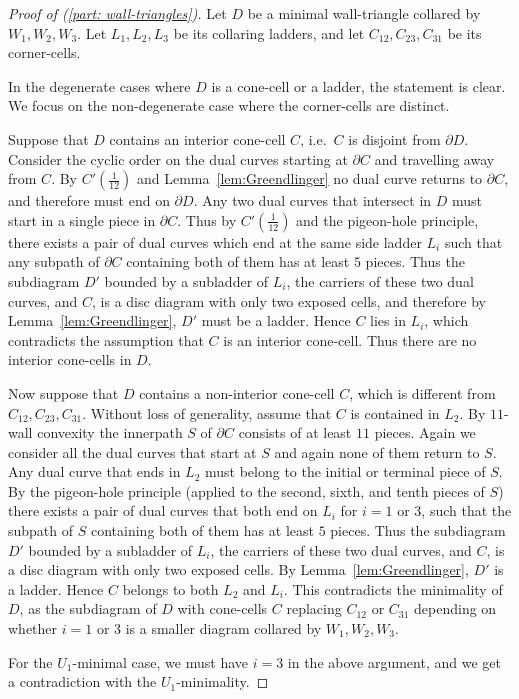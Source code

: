 \documentclass[12pt,oneside]{amsart}
\theoremstyle{definition}
\theoremstyle{definition}
\theoremstyle{remark}
\begin{document}
\begin{proof}[Proof of (\ref{part: wall-triangles})]
Let $D$ be a minimal wall-triangle collared by $W_1,W_2, W_3$. Let $L_1, L_2, L_3$ be its collaring ladders, and let $C_{12}, C_{23}, C_{31}$ be its corner-cells.  

In the  degenerate cases where $ D$ is a cone-cell or a ladder, the statement is clear.  
We focus on the non-degenerate case where the corner-cells are distinct.

Suppose that $D$ contains an interior cone-cell $C$, i.e.\ $C$ is disjoint from $\partial D$. Consider the cyclic order on the dual curves starting at $\partial C$ and travelling away from $C$. By $C'(\frac{1}{12})$ and Lemma~\ref{lem:Greendlinger} no dual curve returns to $\partial C$, and therefore must end on $\partial D$. Any two dual curves that intersect in $D$ must start in a single piece in $\partial C$. Thus by $C'(\frac{1}{12})$ and the pigeon-hole principle, there exists a pair of dual curves which end at the same side ladder $L_i$ such that any subpath of $\partial C$ containing both of them has at least $5$ pieces. Thus the subdiagram $D'$ bounded by a subladder of $L_i$, the carriers of these two dual curves, and $C$, is a disc diagram with only two exposed cells, and therefore by Lemma~\ref{lem:Greendlinger}, $D'$ must be a ladder. Hence $C$ lies in $L_i$, which contradicts the assumption that $C$ is an interior cone-cell. Thus there are no interior cone-cells in $D$.

Now suppose that $D$ contains a non-interior cone-cell $C$, which is different from $C_{12}, C_{23}, C_{31}$. Without loss of generality, assume that $C$ is contained in $L_2$. By $11$-wall convexity the innerpath $S$ of $\partial C$ consists of at least $11$ pieces. Again we consider all the dual curves that start at $S$ and again none of them return to $S$. Any dual curve that ends in $L_2$ must belong to the initial or terminal piece of $S$. By the pigeon-hole principle (applied to the second, sixth, and tenth pieces of $S$) there exists a pair of dual curves that both end on $L_i$  for $i=1$ or $3$, such that the subpath of $S$ containing both of them has at least $5$ pieces. Thus the subdiagram $D'$ bounded by a subladder of $L_i$, the carriers of these two dual curves, and $C$, is a disc diagram with only two exposed cells. By Lemma~\ref{lem:Greendlinger}, $D'$ is a ladder. Hence $C$ belongs to both $L_2$ and $L_i$. This contradicts the minimality of $D$, as the subdiagram of $D$ with cone-cells $C$ replacing $C_{12}$ or $C_{31}$ depending on whether $i=1$ or $3$ is a smaller diagram collared by $W_1, W_2, W_3$. 

For the $U_1$-minimal case, we must have $i=3$ in the above argument, and we get a contradiction with the $U_1$-minimality.
\end{proof}
\end{document}
